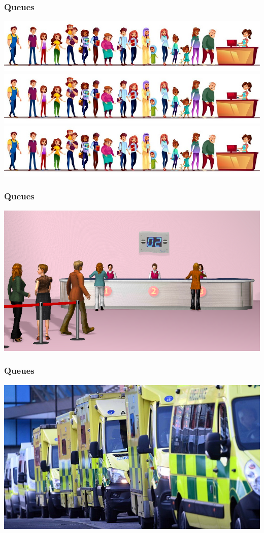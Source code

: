 \begin{frame}
    \frametitle{Queues}
    \centering

    \includegraphics[scale=0.3]{Bin/supermarket-queue.jpg}
    \includegraphics[scale=0.3]{Bin/supermarket-queue.jpg}
    \includegraphics[scale=0.3]{Bin/supermarket-queue.jpg}
\end{frame}


\begin{frame}
    \frametitle{Queues}
    \centering

    \includegraphics[scale=0.55]{Bin/bank-queue.png}
\end{frame}


\begin{frame}
    \frametitle{Queues}
    \centering
    \includegraphics[scale=0.4]{Bin/ambulance_queue.jpg}
\end{frame}